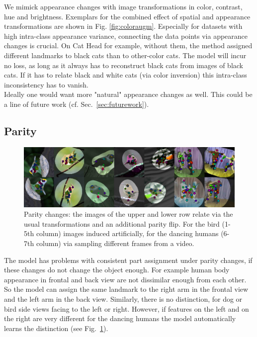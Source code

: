 			We mimick appearance changes with image transformations in color, contrast, hue and brightness. Exemplars for the combined effect of spatial and appearance transformations are shown in Fig. \ref{fig:coloraugm}.
			Especially for datasets with high intra-class appearance variance, connecting the data points via appearance changes is crucial. On Cat Head for example, without them, the method assigned different landmarks to black cats than to other-color cats. The model will incur no loss, as long as it always has to reconstruct black cats from images of black cats. If it has to relate black and white cats (\eg via color inversion) this intra-class inconsistency has to vanish.\\
			Ideally one would want more "natural" appearance changes as well. This could be a line of future work (cf. Sec.~\ref{sec:futurework}).


		\subsection{Parity}
			\begin{figure}[htp]
				\centering
				\includegraphics[trim={0cm 0cm 0cm 0cm},clip, width=1.\linewidth]{fig/shape/parity}
				\caption{Parity changes: the images of the upper and lower row relate via the usual transformations and an additional parity flip. For the bird (1-5th column) images induced artificially, for the dancing humans (6-7th column) via sampling different frames from a video.}
				\label{fig:parity}
			\end{figure}
			The model has problems with consistent part assignment under parity changes, if these changes do not change the object enough. For example human body appearance in frontal and back view are not dissimilar enough from each other. So the model can assign the same landmark to \eg the right arm in the frontal view and the left arm in the back view.
			Similarly, there is no distinction, for dog or bird side views facing to the left or right. However, if features on the left and on the right are very different \eg for the dancing humans the model automatically learns the distinction (see Fig.~\ref{fig:parity}).

